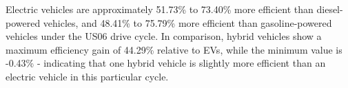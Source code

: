 	Electric vehicles are approximately 51.73\% to 73.40\% more efficient than diesel-powered vehicles, and 48.41\% to 75.79\% more efficient than gasoline-powered vehicles under the US06 drive cycle. In comparison, hybrid vehicles show a maximum efficiency gain of 44.29\% relative to EVs, while the minimum value is -0.43\% - indicating that one hybrid vehicle is slightly more efficient than an electric vehicle in this particular cycle.
